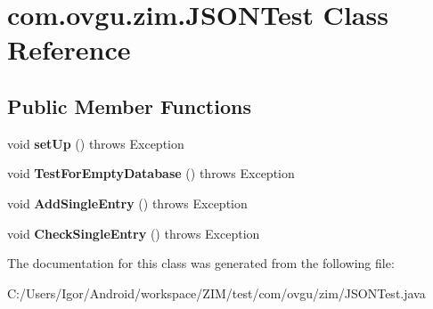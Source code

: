 \hypertarget{classcom_1_1ovgu_1_1zim_1_1_j_s_o_n_test}{\section{com.\-ovgu.\-zim.\-J\-S\-O\-N\-Test Class Reference}
\label{classcom_1_1ovgu_1_1zim_1_1_j_s_o_n_test}
}
\subsection*{Public Member Functions}
\begin{DoxyCompactItemize}
\item 
\hypertarget{classcom_1_1ovgu_1_1zim_1_1_j_s_o_n_test_a2e38804d49ebfe4b796e9c066a98fd03}{void {\bfseries set\-Up} ()  throws Exception }\label{classcom_1_1ovgu_1_1zim_1_1_j_s_o_n_test_a2e38804d49ebfe4b796e9c066a98fd03}

\item 
\hypertarget{classcom_1_1ovgu_1_1zim_1_1_j_s_o_n_test_a3f902b96830e6f01aeac01f3d0baad7c}{void {\bfseries Test\-For\-Empty\-Database} ()  throws Exception }\label{classcom_1_1ovgu_1_1zim_1_1_j_s_o_n_test_a3f902b96830e6f01aeac01f3d0baad7c}

\item 
\hypertarget{classcom_1_1ovgu_1_1zim_1_1_j_s_o_n_test_abfb65d4c2a54c558cc61e8fc959f2ae4}{void {\bfseries Add\-Single\-Entry} ()  throws Exception }\label{classcom_1_1ovgu_1_1zim_1_1_j_s_o_n_test_abfb65d4c2a54c558cc61e8fc959f2ae4}

\item 
\hypertarget{classcom_1_1ovgu_1_1zim_1_1_j_s_o_n_test_a2df6d842c388f5c59ad398ec9b0e3c65}{void {\bfseries Check\-Single\-Entry} ()  throws Exception }\label{classcom_1_1ovgu_1_1zim_1_1_j_s_o_n_test_a2df6d842c388f5c59ad398ec9b0e3c65}

\end{DoxyCompactItemize}


The documentation for this class was generated from the following file\-:\begin{DoxyCompactItemize}
\item 
C\-:/\-Users/\-Igor/\-Android/workspace/\-Z\-I\-M/test/com/ovgu/zim/J\-S\-O\-N\-Test.\-java\end{DoxyCompactItemize}
